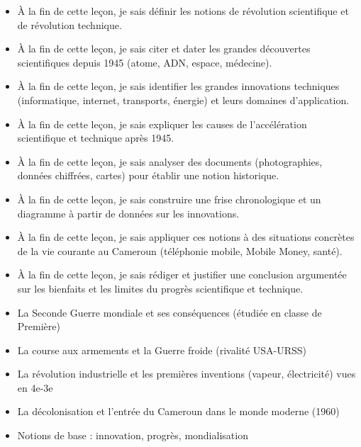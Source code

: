 \documentclass[11pt]{article}
\begin{document}
\begin{objectifs}
\begin{itemize}
\item À la fin de cette leçon, je sais définir les notions de révolution scientifique et de révolution technique.
\item À la fin de cette leçon, je sais citer et dater les grandes découvertes scientifiques depuis 1945 (atome, ADN, espace, médecine).
\item À la fin de cette leçon, je sais identifier les grandes innovations techniques (informatique, internet, transports, énergie) et leurs domaines d'application.
\item À la fin de cette leçon, je sais expliquer les causes de l'accélération scientifique et technique après 1945.
\item À la fin de cette leçon, je sais analyser des documents (photographies, données chiffrées, cartes) pour établir une notion historique.
\item À la fin de cette leçon, je sais construire une frise chronologique et un diagramme à partir de données sur les innovations.
\item À la fin de cette leçon, je sais appliquer ces notions à des situations concrètes de la vie courante au Cameroun (téléphonie mobile, Mobile Money, santé).
\item À la fin de cette leçon, je sais rédiger et justifier une conclusion argumentée sur les bienfaits et les limites du progrès scientifique et technique.
\end{itemize}
\end{objectifs}

\begin{prerequis}
\begin{itemize}
\item La Seconde Guerre mondiale et ses conséquences (étudiée en classe de Première)
\item La course aux armements et la Guerre froide (rivalité USA-URSS)
\item La révolution industrielle et les premières inventions (vapeur, électricité) vues en 4e-3e
\item La décolonisation et l'entrée du Cameroun dans le monde moderne (1960)
\item Notions de base : innovation, progrès, mondialisation
\end{itemize}
\end{prerequis}

\newpage
\end{document}
